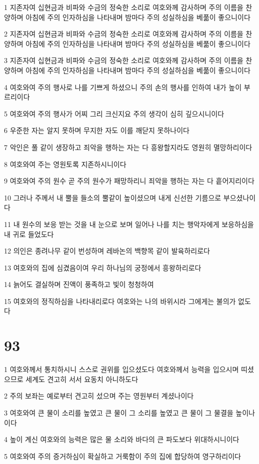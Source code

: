 \par 1 지존자여 십현금과 비파와 수금의 정숙한 소리로 여호와께 감사하며 주의 이름을 찬양하며 아침에 주의 인자하심을 나타내며 밤마다 주의 성실하심을 베풂이 좋으니이다
\par 2 지존자여 십현금과 비파와 수금의 정숙한 소리로 여호와께 감사하며 주의 이름을 찬양하며 아침에 주의 인자하심을 나타내며 밤마다 주의 성실하심을 베풂이 좋으니이다
\par 3 지존자여 십현금과 비파와 수금의 정숙한 소리로 여호와께 감사하며 주의 이름을 찬양하며 아침에 주의 인자하심을 나타내며 밤마다 주의 성실하심을 베풂이 좋으니이다
\par 4 여호와여 주의 행사로 나를 기쁘게 하셨으니 주의 손의 행사를 인하여 내가 높이 부르리이다
\par 5 여호와여 주의 행사가 어찌 그리 크신지요 주의 생각이 심히 깊으시니이다
\par 6 우준한 자는 알지 못하며 무지한 자도 이를 깨닫지 못하나이다
\par 7 악인은 풀 같이 생장하고 죄악을 행하는 자는 다 흥왕할지라도 영원히 멸망하리이다
\par 8 여호와여 주는 영원토록 지존하시니이다
\par 9 여호와여 주의 원수 곧 주의 원수가 패망하리니 죄악을 행하는 자는 다 흩어지리이다
\par 10 그러나 주께서 내 뿔을 들소의 뿔같이 높이셨으며 내게 신선한 기름으로 부으셨나이다
\par 11 내 원수의 보응 받는 것을 내 눈으로 보며 일어나 나를 치는 행악자에게 보응하심을 내 귀로 들었도다
\par 12 의인은 종려나무 같이 번성하며 레바논의 백향목 같이 발육하리로다
\par 13 여호와의 집에 심겼음이여 우리 하나님의 궁정에서 흥왕하리로다
\par 14 늙어도 결실하며 진액이 풍족하고 빛이 청청하여
\par 15 여호와의 정직하심을 나타내리로다 여호와는 나의 바위시라 그에게는 불의가 없도다

\chapter{93}

\par 1 여호와께서 통치하시니 스스로 권위를 입으셨도다 여호와께서 능력을 입으시며 띠셨으므로 세계도 견고히 서서 요동치 아니하도다
\par 2 주의 보좌는 예로부터 견고히 섰으며 주는 영원부터 계셨나이다
\par 3 여호와여 큰 물이 소리를 높였고 큰 물이 그 소리를 높였고 큰 물이 그 물결을 높이나이다
\par 4 높이 계신 여호와의 능력은 많은 물 소리와 바다의 큰 파도보다 위대하시니이다
\par 5 여호와여 주의 증거하심이 확실하고 거룩함이 주의 집에 합당하여 영구하리이다

